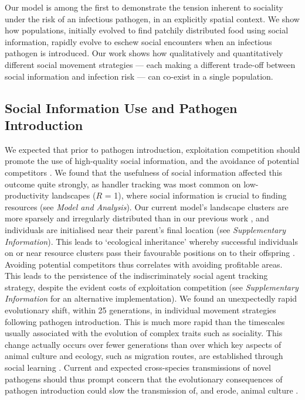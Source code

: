 Our model is among the first to demonstrate the tension inherent to sociality under the risk of an infectious pathogen, in an explicitly spatial context.
We show how populations, initially evolved to find patchily distributed food using social information, rapidly evolve to eschew social encounters when an infectious pathogen is introduced.
Our work shows how qualitatively and quantitatively different social movement strategies --- each making a different trade-off between social information and infection risk --- can co-exist in a single population.

\subsection*{Social Information Use and Pathogen Introduction}

We expected that prior to pathogen introduction, exploitation competition should promote the use of high-quality social information, and the avoidance of potential competitors \citep[handler tracking;][]{gupte2021a}.
We found that the usefulness of social information affected this outcome quite strongly, as handler tracking was most common on low-productivity landscapes ($R$ = 1), where social information is crucial to finding resources (see \textit{Model and Analysis}).
Our current model's landscape clusters are more sparsely and irregularly distributed than in our previous work \citep{gupte2021a}, and individuals are initialised near their parent's final location (see \textit{Supplementary Information}).
This leads to `ecological inheritance' whereby successful individuals on or near resource clusters pass their favourable positions on to their offspring \citep{badyaev2009}.
Avoiding potential competitors thus correlates with avoiding profitable areas.
This leads to the persistence of the indiscriminately social agent tracking strategy, despite the evident costs of exploitation competition (see \textit{Supplementary Information} for an alternative implementation).
We found an unexpectedly rapid evolutionary shift, within 25 generations, in individual movement strategies following pathogen introduction.
This is much more rapid than the timescales usually associated with the evolution of complex traits such as sociality.
This change actually occurs over fewer generations than over which key aspects of animal culture and ecology, such as migration routes, are established through social learning \citep{jesmer2018,cantor2021}.
Current and expected cross-species transmissions of novel pathogens \citep{carlson2022a,pusceddu2021} should thus prompt concern that the evolutionary consequences of pathogen introduction could slow the transmission of, and erode, animal culture \citep{cantor2021}.

